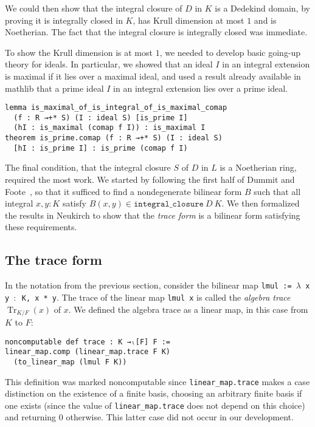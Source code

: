 \documentclass[sn-mathphys]{sn-jnl}%
\newcommand{\lean}[1]{\texttt{#1}\xspace}
\DeclareMathOperator{\Tr}{Tr}
\newcommand{\mathlib}{\textsf{mathlib}\xspace}
\begin{document}
We could then show that the integral closure of $D$ in $K$ is a Dedekind domain,
by proving it is integrally closed in $K$, has Krull dimension at most $1$ and is Noetherian.
The fact that the integral closure is integrally closed was immediate.

To show the Krull dimension is at most $1$, we needed to develop basic going-up theory for ideals.
In particular, we showed that an ideal $I$ in an integral extension is maximal if it lies over a maximal ideal,
and used a result already available in \mathlib that a prime ideal $I$ in an integral extension lies over a prime ideal.
\begin{lstlisting}
lemma is_maximal_of_is_integral_of_is_maximal_comap
  (f : R →+* S) (I : ideal S) [is_prime I]
  (hI : is_maximal (comap f I)) : is_maximal I
theorem is_prime.comap (f : R →+* S) (I : ideal S)
  [hI : is_prime I] : is_prime (comap f I)
\end{lstlisting}

The final condition, that the integral closure $S$ of $D$ in $L$ is a Noetherian ring, required the most work.
We started by following the first half of Dummit and Foote~\cite[Theorem~15.29]{Dummit-and-Foote},
so that it sufficed to find a nondegenerate bilinear form $B$ such that all integral $x, y : K$ satisfy $B(x, y) \in \lean{integral\_closure}\ D\ K$.
We then formalized the results in Neukirch \cite[Sections~2.5--2.8]{Neukirch} to show that the \emph{trace form} is a bilinear form satisfying these requirements.

\subsection{The trace form}\label{sec:trace-form}
In the notation from the previous section, consider the bilinear map \lean{lmul := $\lambda$ x y $:$ K, x~*~y}.
The trace of the linear map \lean{lmul x} is called the \emph{algebra trace} $\Tr_{K / F}(x)$ of $x$.
We defined the algebra trace
as a linear map, in this case from $K$ to $F$:
\begin{lstlisting}
noncomputable def trace : K →ₗ[F] F :=
linear_map.comp (linear_map.trace F K)
  (to_linear_map (lmul F K))
\end{lstlisting}
This definition was marked noncomputable since \lean{linear\_map.trace} makes a case distinction on the existence of a finite basis,
choosing an arbitrary finite basis if one exists (since the value of \lean{linear\_map.trace} does not depend on this choice)
and returning $0$ otherwise.
This latter case did not occur in our development.
\end{document}
